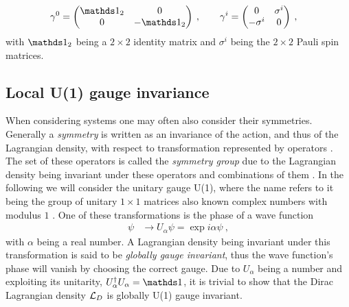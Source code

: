 \documentclass[../main.tex]{subfiles} %
\begin{document}
\begin{align}
    \gamma^0 &=
        \begin{pmatrix}
            \id_2 & 0 \\
            0 & -\id_2
        \end{pmatrix} \: , \qquad
    \gamma^i =
        \begin{pmatrix}
            0 & \sigma^i \\
            -\sigma^i & 0
        \end{pmatrix} \: ,
\end{align}
with $\id_2$ being a $2 \times 2$ identity matrix and $\sigma^i$ being the $2 \times 2$ Pauli spin matrices.




\subsection{Local U(1) gauge invariance} \label{sec:ContinuumQFT_LocalU(1)GaugeInvariance}

When considering systems one may often also consider their symmetries. Generally a \emph{symmetry} is written as an invariance of the action, and thus of the Lagrangian density, with respect to transformation represented by operators \cite{peskin_introToQFT_1995}. The set of these operators is called the \emph{symmetry group} due to the Lagrangian density being invariant under these operators and combinations of them \cite{panyella_masterThesis_2019}. In the following we will consider the unitary gauge U(1), where the name refers to it being the group of unitary $1\times1$ matrices also known complex numbers with modulus $1$ \cite{peskin_introToQFT_1995}. One of these transformations is the phase of a wave function
\begin{align} \label{eq:GlobalU(1)GaugeInvariance}
    \psi &\rightarrow U_\alpha \psi = \exp{i\alpha}\psi \: ,
\end{align}
with $\alpha$ being a real number. A Lagrangian density being invariant under this transformation is said to be \emph{globally gauge invariant}, thus the wave function's phase will vanish by choosing the correct gauge. Due to $U_\alpha$ being a number and exploiting its unitarity, $U_\alpha\dagger U_\alpha = \id$, it is trivial to show that the Dirac Lagrangian density $\mathcal{L}_D$ is globally U(1) gauge invariant.
\end{document}
